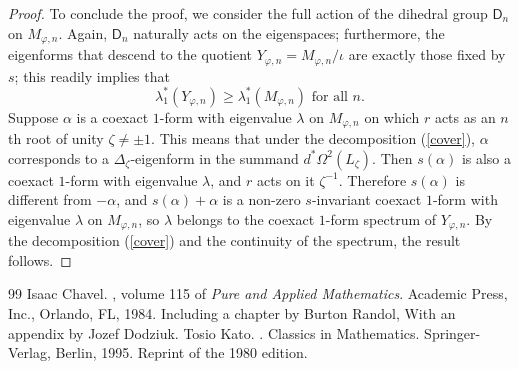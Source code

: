 \documentclass[10pt,a4paper]{amsart}
\begin{document}
\begin{proof}
\par
To conclude the proof, we consider the full action of the dihedral group $\mathsf{D}_n$ on $M_{\varphi,n}$. Again, $\mathsf{D}_n$ naturally acts on the eigenspaces; furthermore, the eigenforms that descend to the quotient $Y_{\varphi,n}=M_{\varphi,n}/\iota$ are exactly those fixed by $s$; this readily implies that
\begin{equation*}
\lambda_1^*(Y_{\varphi,n})\geq \lambda_1^*(M_{\varphi,n}) \text{ for all }n.
\end{equation*}
Suppose $\alpha$ is a coexact $1$-form with eigenvalue $\lambda$ on $M_{\varphi,n}$ on which $r$ acts as an $n$th root of unity $\zeta\neq \pm1$. This means that under the decomposition (\ref{cover}), $\alpha$ corresponds to a $\Delta_\zeta$-eigenform in the summand $d^*\Omega^2(L_\zeta)$. Then $s(\alpha)$ is also a coexact $1$-form with eigenvalue $\lambda$, and $r$ acts on it $\zeta^{-1}$. Therefore $s(\alpha)$ is different from $-\alpha$, and $s(\alpha)+\alpha$ is a non-zero $s$-invariant coexact $1$-form with eigenvalue $\lambda$ on $M_{\varphi,n}$, so $\lambda$ belongs to the coexact $1$-form spectrum of $Y_{\varphi,n}$. By the decomposition (\ref{cover}) and the continuity of the spectrum, the result follows.
\end{proof}

\begin{thebibliography}{99}
 Isaac Chavel. , volume 115 of {\em Pure and Applied Mathematics}. \newblock Academic Press, Inc., Orlando, FL, 1984. \newblock Including a chapter by Burton Randol, With an appendix by Jozef Dodziuk.
 Tosio Kato. . \newblock Classics in Mathematics. Springer-Verlag, Berlin, 1995. \newblock Reprint of the 1980 edition.
\end{thebibliography}
\end{document}
